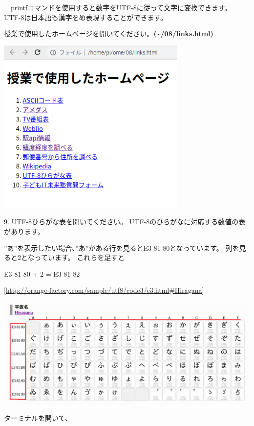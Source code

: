 \documentclass[a4paper,12pt,dvipdfmx]{jarticle}
\begin{document}
\ \ printfコマンドを使用すると数字をUTF-8に従って文字に変換できます。
UTF-8は日本語も漢字をめ表現することができます。

授業で使用したホームページを開いてください。\textbf{({\textasciitilde}/08/links.html)}



\begin{center}
\includegraphics[width=9.398cm]{textbook-img017.png}

\end{center}


\bigskip


\bigskip

9.
UTF-8ひらがな表を開いてください。
UTF-8のひらがなに対応する数値の表があります。

”あ”を表示したい場合、”あ”がある行を見るとE3
81
80となっています。
列を見ると2となっています。
これらを足すと

E3 81 80 + 2 = E3 81 82

[\url{http://orange-factory.com/sample/utf8/code3/e3.html#Hiragana}]

\begin{center}
\includegraphics[width=17.006cm]{textbook-img018.png}

\end{center}
ターミナルを開いて、
\end{document}
